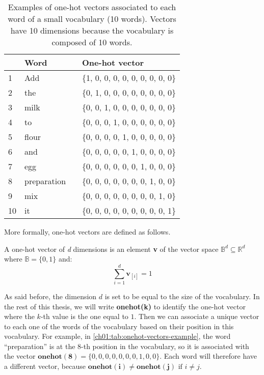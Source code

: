   \begin{table}[htb]
    \centering
    \begin{tabular}{llcl}
      \toprule[0.15em]
        & Word && One-hot vector\\
      \midrule[0.08em]
      1  & Add         && \{1, 0, 0, 0, 0, 0, 0, 0, 0, 0\}\\
      2  & the         && \{0, 1, 0, 0, 0, 0, 0, 0, 0, 0\}\\
      3  & milk        && \{0, 0, 1, 0, 0, 0, 0, 0, 0, 0\}\\
      4  & to          && \{0, 0, 0, 1, 0, 0, 0, 0, 0, 0\}\\
      5  & flour       && \{0, 0, 0, 0, 1, 0, 0, 0, 0, 0\}\\
      6  & and         && \{0, 0, 0, 0, 0, 1, 0, 0, 0, 0\}\\
      7  & egg         && \{0, 0, 0, 0, 0, 0, 1, 0, 0, 0\}\\
      8  & preparation && \{0, 0, 0, 0, 0, 0, 0, 1, 0, 0\}\\
      9  & mix         && \{0, 0, 0, 0, 0, 0, 0, 0, 1, 0\}\\
      10 & it          && \{0, 0, 0, 0, 0, 0, 0, 0, 0, 1\}\\
      \bottomrule[0.15em]
    \end{tabular}
    \caption[Examples of one-hot vectors associated to each word of a small
    vocabulary.]{Examples of one-hot vectors associated to each word of a small
    vocabulary (10 words). Vectors have 10 dimensions because the vocabulary is
    composed of 10 words.}
    \label{ch01:tab:onehot-vectors-example}
  \end{table}

  \noindent More formally, one-hot vectors are defined as follows.

  \theoremstyle{definition}
  \begin{definition}
    \label{ch01:def:def-onehot}
    A one-hot vector of \textit{d} dimensions is an element \textbf{v} of the
    vector space $\mathbb{B}^d \subseteq \mathbb{R}^d$ where $\mathbb{B} = \{0,
    1\}$ and:
    \begin{equation}
      \sum_{i=1}^d \mathbf{v}_{[i]} = 1
    \end{equation}
  \end{definition}

  As said before, the dimension $d$ is set to be equal to the size of the
  vocabulary. In the rest of this thesis, we will write \textbf{onehot(k)} to
  identify the one-hot vector where the $k$-th value is the one equal to $1$.
  Then we can associate a unique vector to each one of the words of the
  vocabulary based on their position in this vocabulary. For example, in
  \autoref{ch01:tab:onehot-vectors-example}, the word ``preparation'' is at the
  8-th position in the vocabulary, so it is associated with the vector
  $\mathbf{onehot(8)} = \{0, 0, 0, 0, 0, 0, 0, 1, 0, 0\}$. Each word will
  therefore have a different vector, because $\mathbf{onehot(i)} \neq
  \mathbf{onehot(j)} \text{ if } i \neq j$.\medskip

